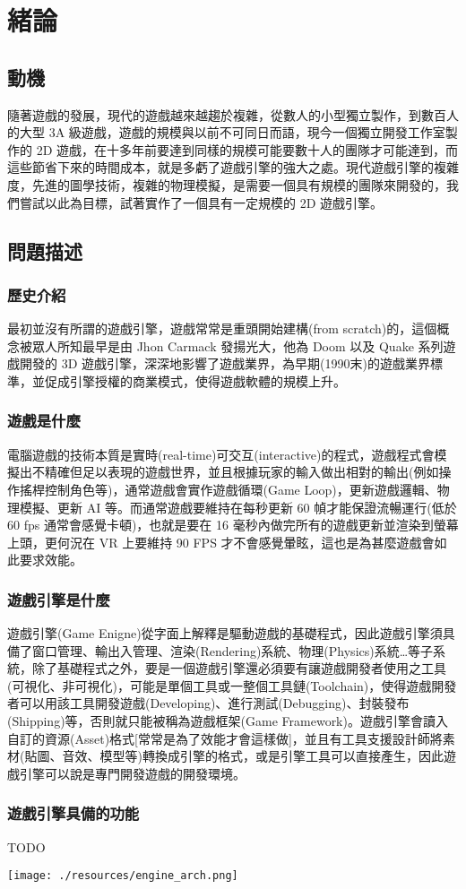 \chapter{緒論}

\section{動機}

隨著遊戲的發展，現代的遊戲越來越趨於複雜，從數人的小型獨立製作，到數百人的大型 3A 級遊戲，遊戲的規模與以前不可同日而語，現今一個獨立開發工作室製作的 2D 遊戲，在十多年前要達到同樣的規模可能要數十人的團隊才可能達到，而這些節省下來的時間成本，就是多虧了遊戲引擎的強大之處。現代遊戲引擎的複雜度，先進的圖學技術，複雜的物理模擬，是需要一個具有規模的團隊來開發的，我們嘗試以此為目標，試著實作了一個具有一定規模的 2D 遊戲引擎。

\section{問題描述}

\subsection{歷史介紹}

最初並沒有所謂的遊戲引擎，遊戲常常是重頭開始建構(from scratch)的，這個概念被眾人所知最早是由 Jhon Carmack 發揚光大，他為 Doom 以及 Quake 系列遊戲開發的 3D 遊戲引擎，深深地影響了遊戲業界，為早期(1990末)的遊戲業界標準，並促成引擎授權的商業模式，使得遊戲軟體的規模上升。

\subsection{遊戲是什麼}
電腦遊戲的技術本質是實時(real-time)可交互(interactive)的程式，遊戲程式會模擬出不精確但足以表現的遊戲世界，並且根據玩家的輸入做出相對的輸出(例如操作搖桿控制角色等)，通常遊戲會實作遊戲循環(Game Loop)，更新遊戲邏輯、物理模擬、更新 AI 等。而通常遊戲要維持在每秒更新 60 幀才能保證流暢運行(低於 60 fps 通常會感覺卡頓)，也就是要在 16 毫秒內做完所有的遊戲更新並渲染到螢幕上頭，更何況在 VR 上要維持 90 FPS 才不會感覺暈眩，這也是為甚麼遊戲會如此要求效能。

\subsection{遊戲引擎是什麼}

遊戲引擎(Game Enigne)從字面上解釋是驅動遊戲的基礎程式，因此遊戲引擎須具備了窗口管理、輸出入管理、渲染(Rendering)系統、物理(Physics)系統…等子系統，除了基礎程式之外，要是一個遊戲引擎還必須要有讓遊戲開發者使用之工具(可視化、非可視化)，可能是單個工具或一整個工具鏈(Toolchain)，使得遊戲開發者可以用該工具開發遊戲(Developing)、進行測試(Debugging)、封裝發布(Shipping)等，否則就只能被稱為遊戲框架(Game Framework)。遊戲引擎會讀入自訂的資源(Asset)格式[常常是為了效能才會這樣做]，並且有工具支援設計師將素材(貼圖、音效、模型等)轉換成引擎的格式，或是引擎工具可以直接產生，因此遊戲引擎可以說是專門開發遊戲的開發環境。

\subsection{遊戲引擎具備的功能}

TODO

\texttt{[image: ./resources/engine\_arch.png]}

\newpage